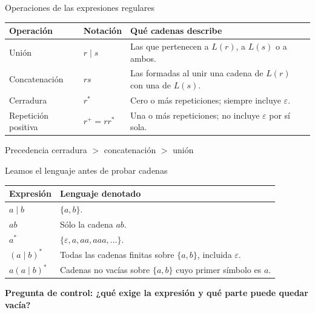 \documentclass[11pt,spanish]{beamer}
\newcommand{\term}[1]{\textbf{\textcolor{indiagreen!80!black}{#1}}}
\begin{document}
\begin{frame}{Operaciones de las expresiones regulares}
\vfill

\begin{center}
\small
\renewcommand{\arraystretch}{1.3}
\begin{tabular}{|L{.20\textwidth}|L{.18\textwidth}|L{.50\textwidth}|}
\hline
\textbf{Operación} & \textbf{Notación} & \textbf{Qué cadenas describe} \tabularnewline
\hline
Unión & \(r\mid s\) & Las que pertenecen a \(L(r)\), a \(L(s)\) o a ambos. \tabularnewline
\hline
Concatenación & \(rs\) & Las formadas al unir una cadena de \(L(r)\) con una de \(L(s)\). \tabularnewline
\hline
Cerradura & \(r^{*}\) & Cero o más repeticiones; siempre incluye \(\varepsilon\). \tabularnewline
\hline
Repetición positiva & \(r^{+}=rr^{*}\) & Una o más repeticiones; no incluye \(\varepsilon\) por sí sola. \tabularnewline
\hline
\end{tabular}
\end{center}

\bigskip
\begin{block}{Precedencia}
\centering
cerradura \(>\) concatenación \(>\) unión
\end{block}

\vfill
\end{frame}

\begin{frame}{Leamos el lenguaje antes de probar cadenas}
\vfill

\begin{center}
\small
\renewcommand{\arraystretch}{1.22}
\begin{tabular}{|L{.20\textwidth}|L{.67\textwidth}|}
\hline
\textbf{Expresión} & \textbf{Lenguaje denotado} \tabularnewline
\hline
\(a\mid b\) & \(\{a,b\}\). \tabularnewline
\hline
\(ab\) & Sólo la cadena \(ab\). \tabularnewline
\hline
\(a^{*}\) & \(\{\varepsilon,a,aa,aaa,\ldots\}\). \tabularnewline
\hline
\((a\mid b)^{*}\) & Todas las cadenas finitas sobre \(\{a,b\}\), incluida \(\varepsilon\). \tabularnewline
\hline
\(a(a\mid b)^{*}\) & Cadenas no vacías sobre \(\{a,b\}\) cuyo primer símbolo es \(a\). \tabularnewline
\hline
\end{tabular}
\end{center}

\bigskip
\begin{center}
\term{Pregunta de control: ¿qué exige la expresión y qué parte puede quedar vacía?}
\end{center}

\vfill
\end{frame}
\end{document}
